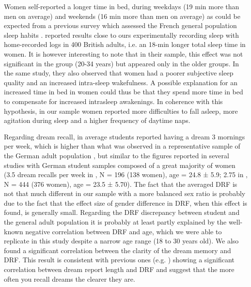 Women self-reported a longer time in bed, during weekdays (19 min more than men on average) and weekends (16 min more than men on average) as could be expected from a previous survey which assessed the French general population sleep habits \citep{beck_insomnia_2013}. \citet{reyner_gender-and_1995} reported results close to ours experimentally recording sleep with home-recorded logs in 400 British adults, i.e. an 18-min longer total sleep time in women. It is however interesting to note that in their sample, this effect was not significant in the  group (20-34 years) but appeared only in the older groups. In the same study, they also observed that women had a poorer subjective sleep quality and an increased intra-sleep wakefulness. A possible explanation for an increased time in bed in women could thus be that they spend more time in bed to compensate for increased intrasleep awakenings. In coherence with this hypothesis, in our sample women reported more difficulties to fall asleep, more agitation during sleep and a higher frequency of daytime naps.

Regarding dream recall, in average students reported having a dream 3 mornings per week, which is higher than what was observed in a representative sample of the German adult population \citep{schredl_dream_2008}, but similar to the figures reported in several studies with German student samples composed of a great majority of women (3.5 dream recalls per week in \citealp{schredl_reliability_2005}, N = 196 (138 women), age = 24.8 ± 5.9; 2.75 in \citealp{schredl_factors_2003},  N = 444 (376 women), age = 23.5 ± 5.70). The fact that the averaged DRF is not that much different in our sample with a more balanced sex ratio is probably due to the fact that the effect size of gender difference in DRF, when this effect is found, is generally small. Regarding the DRF discrepancy between student and the general adult population it is probably at least partly explained by the well-known negative correlation between DRF and age, which we were able to replicate in this study despite a narrow age range (18 to 30 years old). We also found a significant correlation between the clarity of the dream memory and DRF. This result is consistent with previous ones (e.g. \citealp{schredl_relationship_2000}) showing a significant correlation between dream report length and DRF and suggest that the more often you recall dreams the clearer they are.

